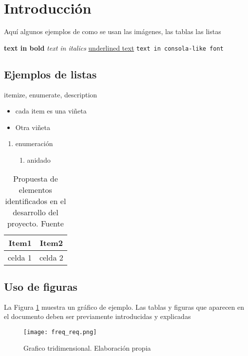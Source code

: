 \section{Introducción}

Aquí algunos ejemplos de como se usan las imágenes, las tablas las listas

\textbf{ text in bold}
\textit{text in italics}
\underline{underlined text}
\texttt{text in consola-like font}

\subsection*{Ejemplos de listas}
itemize, enumerate, description

\begin{itemize}
    \item cada item es una viñeta
    \item Otra viñeta
\end{itemize}

\begin{enumerate}
    \item enumeración
    \begin{enumerate}
        \item anidado
    \end{enumerate}
\end{enumerate}

\begin{figure*}[htb]
\centering
{}

\label{fig:examples}
\end{figure*}
 
 \begin{table}[htb]
     \centering
     \begin{tabular}{rc}
	\toprule
    	Item1 & Item2  \\
	\midrule
	celda 1 & celda 2\\
	\bottomrule

\end{tabular}
     \caption{Propuesta de elementos identificados en el desarrollo del proyecto. Fuente \citep{Hinton2012}}
     \label{tab:my_label}
 \end{table}

\subsection*{Uso de figuras}
La Figura \ref{fig:figure1} muestra un gráfico de ejemplo. Las tablas y figuras que aparecen en el documento deben ser previamente introducidas y explicadas


\begin{figure}
\centering
\texttt{[image: freq\_req.png]}
\caption{Grafico tridimensional. Elaboración propia}
\label{fig:figure1}
\end{figure}